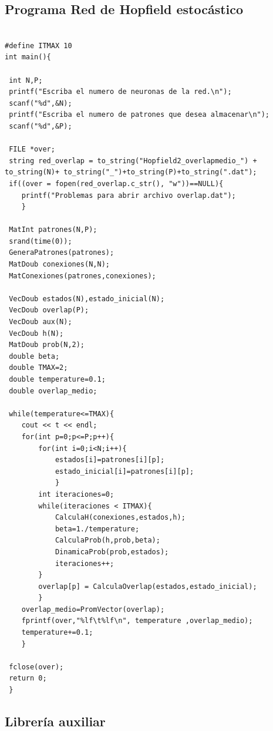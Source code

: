 \documentclass[aps,prb,onecolumn,10pt,floatfix,superscriptaddress]{article} %
\begin{document}
\subsection{Programa Red de Hopfield estoc\'astico}
\begin{lstlisting}[frame=single,breaklines=true]

#define ITMAX 10
int main(){

 int N,P;
 printf("Escriba el numero de neuronas de la red.\n");
 scanf("%d",&N);
 printf("Escriba el numero de patrones que desea almacenar\n");
 scanf("%d",&P);
		
 FILE *over;
 string red_overlap = to_string("Hopfield2_overlapmedio_") + to_string(N)+ to_string("_")+to_string(P)+to_string(".dat");
 if((over = fopen(red_overlap.c_str(), "w"))==NULL){
	printf("Problemas para abrir archivo overlap.dat");
	}
	
 MatInt patrones(N,P);
 srand(time(0));
 GeneraPatrones(patrones);
 MatDoub conexiones(N,N);
 MatConexiones(patrones,conexiones);

 VecDoub estados(N),estado_inicial(N);
 VecDoub overlap(P);
 VecDoub aux(N);
 VecDoub h(N);
 MatDoub prob(N,2);
 double beta;
 double TMAX=2;
 double temperature=0.1;
 double overlap_medio;
	
 while(temperature<=TMAX){
 	cout << t << endl;
	for(int p=0;p<=P;p++){
		for(int i=0;i<N;i++){
			estados[i]=patrones[i][p];
			estado_inicial[i]=patrones[i][p];
			}
		int iteraciones=0;
		while(iteraciones < ITMAX){
			CalculaH(conexiones,estados,h);
			beta=1./temperature;
			CalculaProb(h,prob,beta);
			DinamicaProb(prob,estados);
			iteraciones++;
		}
		overlap[p] = CalculaOverlap(estados,estado_inicial);
		}
	overlap_medio=PromVector(overlap);	
	fprintf(over,"%lf\t%lf\n", temperature ,overlap_medio);
	temperature+=0.1;
	}
	
 fclose(over);
 return 0;
 }

\end{lstlisting}

\subsection{Librer\'ia auxiliar}
\end{document}
